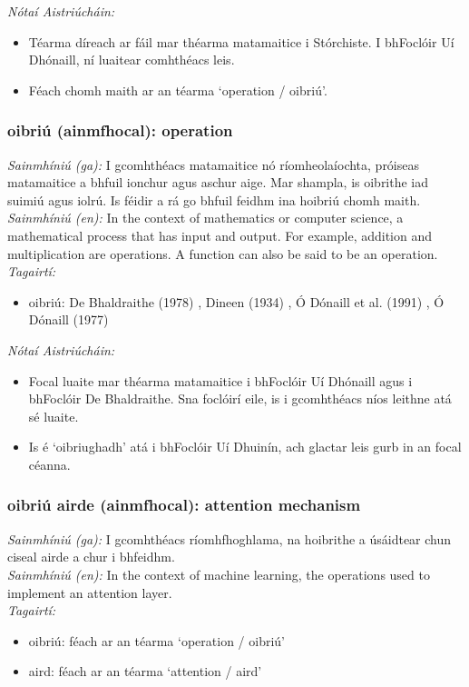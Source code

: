  \noindent \textit{Nótaí Aistriúcháin:}
\begin{itemize}
	\item Téarma díreach ar fáil mar théarma matamaitice i Stórchiste. I bhFoclóir Uí Dhónaill, ní luaitear comhthéacs leis.
	\item Féach chomh maith ar an téarma `operation / oibriú'.
\end{itemize}


\subsubsection*{oibriú (ainmfhocal): operation}
 \noindent \textit{Sainmhíniú (ga):} I gcomhthéacs matamaitice nó ríomheolaíochta, próiseas matamaitice a bhfuil ionchur agus aschur aige. Mar shampla, is oibrithe iad suimiú agus iolrú. Is féidir a rá go bhfuil feidhm ina hoibriú chomh maith.
\\
 \noindent \textit{Sainmhíniú (en):} In the context of mathematics or computer science, a mathematical process that has input and output. For example, addition and multiplication are operations. A function can also be said to be an operation.
\\
 \noindent \textit{Tagairtí:}
\begin{itemize}
	\item oibriú: De Bhaldraithe (1978) \cite{de-bhaldraithe}, Dineen (1934) \cite{dineen}, Ó Dónaill et al. (1991) \cite{focloir-beag}, Ó Dónaill (1977) \cite{odonaill}
\end{itemize}

 \noindent \textit{Nótaí Aistriúcháin:}
\begin{itemize}
	\item Focal luaite mar théarma matamaitice i bhFoclóir Uí Dhónaill agus i bhFoclóir De Bhaldraithe. Sna foclóirí eile, is i gcomhthéacs níos leithne atá sé luaite.
	\item Is é `oibriughadh' atá i bhFoclóir Uí Dhuinín, ach glactar leis gurb in an focal céanna.
\end{itemize}


\subsubsection*{oibriú airde (ainmfhocal): attention mechanism}
 \noindent \textit{Sainmhíniú (ga):} I gcomhthéacs ríomhfhoghlama, na hoibrithe a úsáidtear chun ciseal airde a chur i bhfeidhm.
\\
 \noindent \textit{Sainmhíniú (en):} In the context of machine learning, the operations used to implement an attention layer.
\\
 \noindent \textit{Tagairtí:}
\begin{itemize}
	\item oibriú: féach ar an téarma `operation / oibriú'
	\item aird: féach ar an téarma `attention / aird'
\end{itemize}

